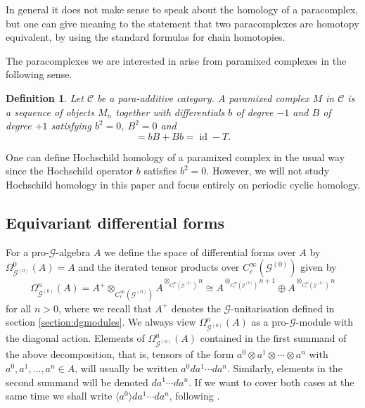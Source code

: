 \documentclass{amsart}
\newtheorem{dfn}[thm]{Definition}
\newcommand{\G}{\mathcal{G}}
\newcommand{\ccinfty}{C_c^\infty}
\DeclareMathOperator{\id}{id}
\begin{document}
In general it does not make sense to speak about the homology of a paracomplex, but one can give meaning to the statement that two paracomplexes are homotopy equivalent, by using the standard formulas for chain homotopies. 

The paracomplexes we are interested in arise from paramixed complexes in the following sense. 

\begin{dfn} 
Let $ \mathcal{C} $ be a para-additive category. A paramixed complex $ M $ in $ \mathcal{C} $ is a sequence of objects $ M_n $ together with differentials $ b $ of degree $ -1 $ and $ B $ of degree $ + 1 $ satisfying
$ b^2 = 0 $, $ B^2 = 0 $ and
\begin{equation*}
[b,B] = bB + Bb = \id - T.
\end{equation*}
\end{dfn}

One can define Hochschild homology of a paramixed complex in the usual way since the 
Hochschild operator $ b $ satisfies $ b^2 = 0 $. However, we will not study Hochschild homology in this paper and focus entirely on periodic cyclic homology. 

\subsection{Equivariant differential forms}

For a pro-$ \G $-algebra $ A $ we define the space of differential forms over $ A $ by $ \Omega^0_{\G^{(0)}}(A) = A $ and the iterated tensor products over $ \ccinfty(\G^{(0)}) $ given by 
$$
\Omega^n_{\G^{(0)}}(A) = A^+ \otimes_{\ccinfty(\G^{(0)})} A^{\otimes_{\ccinfty(\G^{(0)})} n} \cong A^{\otimes_{\ccinfty(\G^{(0)})} n + 1} \oplus A^{\otimes_{\ccinfty(\G^{(0)})} n}
$$
for all $ n > 0 $, where we recall that $ A^+ $ denotes the $ \G $-unitarisation defined in section \ref{section:dgmodules}. 
We always view $ \Omega^n_{\G^{(0)}}(A) $ as a pro-$ \G $-module with the diagonal action. Elements of $ \Omega^n_{\G^{(0)}}(A) $ contained in the first summand of the above decomposition, that is, tensors of the form $ a^0 \otimes a^1 \otimes \cdots \otimes a^n $ with $ a^0, a^1, \dots, a^n \in A $, will usually be written $ a^0da^1 \cdots da^n $. Similarly, elements in the second summand  will be denoted $ da^1 \cdots da^n $. If we want to cover both cases at the same time we shall write $ \langle a^0 \rangle da^1 \cdots da^n $, following \cite{MEYER_thesis}. 
\end{document}
